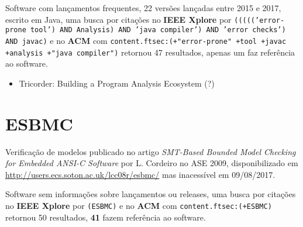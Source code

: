 Software com lançamentos frequentes,
22 versões lançadas
entre 2015 e 2017,
escrito em Java,
uma busca por citações no {\bf IEEE Xplore} por
\texttt{((((('error-prone tool') AND Analysis) AND 'java compiler') AND 'error checks') AND javac)}
e no {\bf ACM} com
\texttt{content.ftsec:(+"error-prone" +tool +javac +analysis +"java compiler")}
retornou
47 resultados,
apenas um faz referência ao software.

\begin{itemize}
\item Tricorder: Building a Program Analysis Ecosystem (?)
\end{itemize}

\section{ESBMC}

Verificação de modelos
publicado no artigo {\it SMT-Based Bounded Model Checking for Embedded ANSI-C Software}
por L. Cordeiro
no ASE 2009,
disponibilizado em \url{http://users.ecs.soton.ac.uk/lcc08r/esbmc/}
mas inacessível em 09/08/2017.

Software sem informações sobre lançamentos ou releases,
uma busca por citações no {\bf IEEE Xplore} por
\texttt{(ESBMC)}
e no {\bf ACM} com
\texttt{content.ftsec:(+ESBMC)}
retornou
50 resultados,
{\bf 41} fazem referência ao software.


